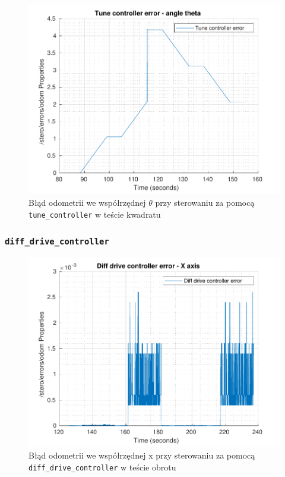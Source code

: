 \documentclass{mwrep}
\begin{document}
\begin{figure}[H]
	\centering
	\includegraphics[scale=0.85]{./figures/pro1/square_tune/square_tune_theta.pdf}
	\caption{Błąd odometrii we współrzędnej $\theta$ przy sterowaniu za pomocą \texttt{tune\_{controller}} w teście kwadratu}
\end{figure}

\subsubsection{\texttt{diff\_{}drive\_{}controller}}
\label{pro1_figures_square_diff}
\begin{figure}[H]
	\centering
	\includegraphics[scale=0.85]{./figures/pro1/square_diff/square_diff_x.pdf}
	\caption{Błąd odometrii we współrzędnej x przy sterowaniu za pomocą \texttt{diff\_{}drive\_{}controller} w teście obrotu}
\end{figure}
\end{document}
